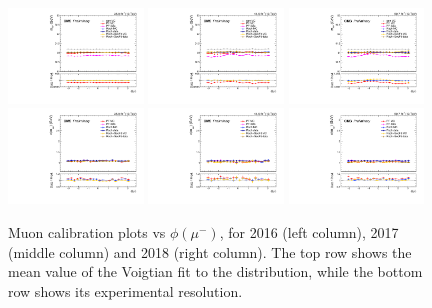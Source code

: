 \begin{figure}[!htb]
      \centering
      \captionsetup{justification=justified}
      \includegraphics[width=0.32\textwidth]{pics/muon_corr/muon_cal/2016/muN_phi_summary_mean.pdf}
      \includegraphics[width=0.32\textwidth]{pics/muon_corr/muon_cal/2017/muN_phi_summary_mean.pdf}
      \includegraphics[width=0.32\textwidth]{pics/muon_corr/muon_cal/2018/muN_phi_summary_mean.pdf}
      \includegraphics[width=0.32\textwidth]{pics/muon_corr/muon_cal/2016/muN_phi_summary_reso.pdf}
      \includegraphics[width=0.32\textwidth]{pics/muon_corr/muon_cal/2017/muN_phi_summary_reso.pdf}
      \includegraphics[width=0.32\textwidth]{pics/muon_corr/muon_cal/2018/muN_phi_summary_reso.pdf}
      \caption{Muon calibration plots vs $\phi(\mu^{-})$, for 2016 (left column), 2017 (middle column) and 2018 (right column).
               The top row shows the mean value of the Voigtian fit to the \mmm distribution, 
               while the bottom row shows its experimental resolution.}
      \label{fig:mucal_muN_phi}
\end{figure}


